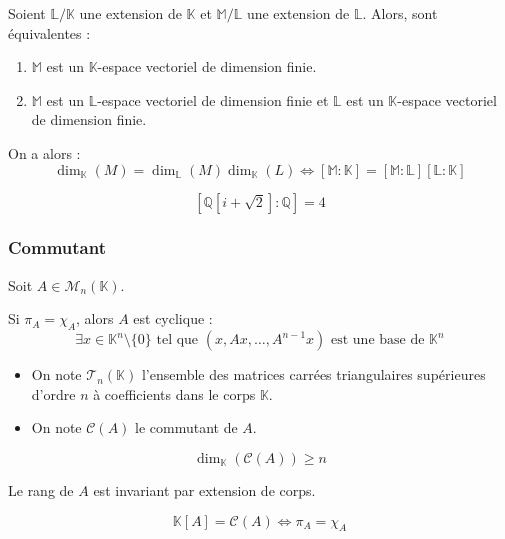   \begin{corollary}
    Soient $\mathbb{L}/\mathbb{K}$ une extension de $\mathbb{K}$ et $\mathbb{M}/\mathbb{L}$ une extension de $\mathbb{L}$. Alors, sont équivalentes :
    \begin{enumerate}[label={\bfseries(\roman*)}]
      \item $\mathbb{M}$ est un $\mathbb{K}$-espace vectoriel de dimension finie.
      \item $\mathbb{M}$ est un $\mathbb{L}$-espace vectoriel de dimension finie et $\mathbb{L}$ est un $\mathbb{K}$-espace vectoriel de dimension finie.
    \end{enumerate}
    On a alors :
    \[ \dim_{\mathbb{K}}(M) = \dim_{\mathbb{L}}(M) \dim_{\mathbb{K}}(L) \iff [\mathbb{M}:\mathbb{K}] = [\mathbb{M}:\mathbb{L}] [\mathbb{L}:\mathbb{K}] \]
  \end{corollary}


  \begin{example}
    \[ [\mathbb{Q}[i + \sqrt{2}]:\mathbb{Q}] = 4 \]
  \end{example}

  \subsubsection{Commutant}

  Soit $A \in \mathcal{M}_n(\mathbb{K})$.


  \begin{lemma}
    Si $\pi_A = \chi_A$, alors $A$ est cyclique :
    \[ \exists x \in \mathbb{K}^n \setminus \{ 0 \} \text{ tel que } (x, Ax, \dots, A^{n-1}x) \text{ est une base de } \mathbb{K}^n \]
  \end{lemma}


  \begin{notation}
    \begin{itemize}
      \item On note $\mathcal{T}_n(\mathbb{K})$ l'ensemble des matrices carrées triangulaires supérieures d'ordre $n$ à coefficients dans le corps $\mathbb{K}$.
      \item On note $\mathcal{C}(A)$ le commutant de $A$.
    \end{itemize}
  \end{notation}

  \begin{lemma}
    \[ \dim_{\mathbb{K}}(\mathcal{C}(A)) \geq n \]
  \end{lemma}

  \begin{lemma}
    Le rang de $A$ est invariant par extension de corps.
  \end{lemma}


  \begin{theorem}
    \[ \mathbb{K}[A] = \mathcal{C}(A) \iff \pi_A = \chi_A \]
  \end{theorem}

